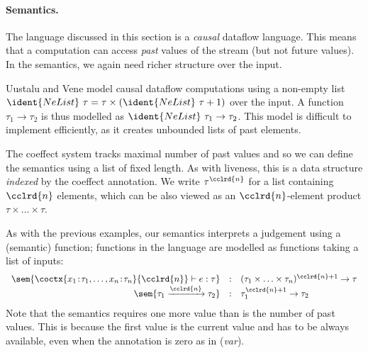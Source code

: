 \paragraph{Semantics.}
The language discussed in this section is a \emph{causal} dataflow language. This means that
a computation can access \emph{past} values of the stream (but not future values). In the semantics,
we again need richer structure over the input.

Uustalu and Vene \cite{comonads-notions} model causal dataflow computations using a non-empty list
$\ident{NeList}~\tau = \tau \times (\ident{NeList}~\tau + 1)$ over the input. A function $\tau_1 \rightarrow \tau_2$
is thus modelled as $\ident{NeList}~\tau_1 \rightarrow \tau_2$. This model is difficult to implement
efficiently, as it creates unbounded lists of past elements.

The coeffect system tracks maximal number of past values and so we can define the semantics using
a list of fixed length. As with liveness, this is a data structure \emph{indexed} by the coeffect
annotation. We write $\tau^{\cclrd{n}}$ for a list containing $\cclrd{n}$ elements, which can be
also viewed as an $\cclrd{n}$-element product $\tau \times \ldots \times \tau$.

As with the previous examples, our semantics interprets a judgement using a (semantic) function;
functions in the language are modelled as functions taking a list of inputs:
%
\begin{equation*}
\begin{array}{rcl}
\sem{\coctx{x_1\!:\!\tau_1, \ldots, x_n\!:\!\tau_n}{ \cclrd{n} } \vdash e : \tau}
  &:& (\tau_1 \times \ldots \times \tau_n)^{\cclrd{n}+1} \rightarrow \tau\\
\sem{\tau_1 \xrightarrow{\cclrd{n}} \tau_2} &:& \tau_1^{\cclrd{n}+1} \rightarrow \tau_2
\end{array}
\end{equation*}
%
Note that the semantics requires one more value than is the number of past values. This is because
the first value is the current value and has to be always available, even when the annotation is
zero as in (\emph{var}).



